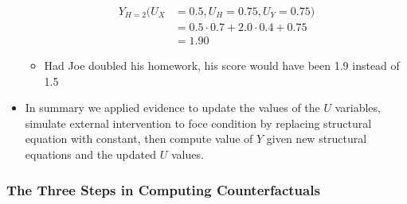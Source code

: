 \documentclass[]{article}
\providecommand{\tightlist}{%
  \setlength{\itemsep}{0pt}\setlength{\parskip}{0pt}}
\begin{document}
\begin{itemize}
  \begin{equation*}
  \begin{split}
    Y_{H=2}(U_X &= 0.5, U_H = 0.75, U_Y = 0.75) \\
    &= 0.5 \cdot 0.7 + 2.0 \cdot 0.4 + 0.75 \\
    &= 1.90
  \end{split}
  \end{equation*}

  \begin{itemize}
  \tightlist
  \item
    Had Joe doubled his homework, his score would have been 1.9 instead
    of 1.5
  \end{itemize}
\item
  In summary we applied evidence to update the values of the \(U\)
  variables, simulate external intervention to foce condition by
  replacing structural equation with constant, then compute value of
  \(Y\) given new structural equations and the updated \(U\) values.
\end{itemize}

\subsubsection{The Three Steps in Computing
Counterfactuals}\label{the-three-steps-in-computing-counterfactuals}
\end{document}
